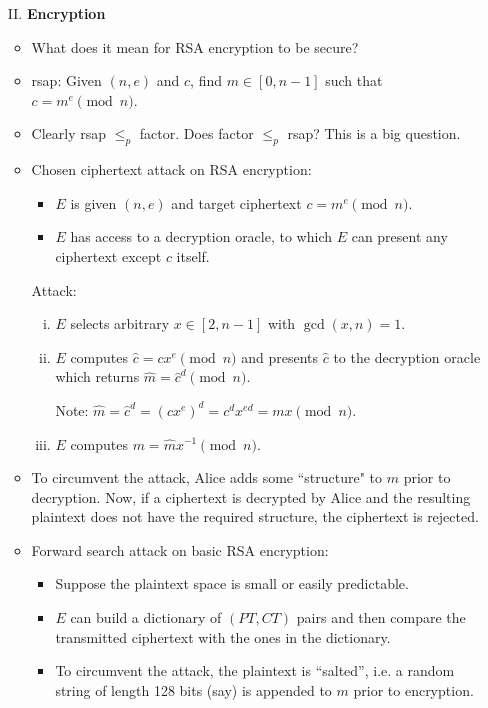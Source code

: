 \documentclass[a4paper,12pt]{article}
\begin{document}
\begin{enumerate}
\item[II.]
{\bf Encryption}
\begin{itemize}
\renewcommand{\labelitemii}{$\circ$}
\item
What does it mean for RSA encryption to be secure?
\item
{\sc rsap:} Given $(n,e)$ and $c$, find $m\in [0,n-1]$ such that $c=m^e\pmod n$.
\item
Clearly {\sc rsap} $\le_p$ {\sc factor}.  Does {\sc factor} $\le_p$ {\sc rsap}?
This is a big question.
\item
Chosen ciphertext attack on RSA encryption:
\begin{itemize}

\item
$E$ is given $(n,e)$ and target ciphertext $c=m^e \pmod n$.
\item
$E$ has access to a decryption oracle, to which $E$ can present any ciphertext except $c$ itself.
\end{itemize}
{\bf} Attack:
\begin{enumerate}[(i)]
\item
$E$ selects arbitrary $x\in [2,n-1]$ with $\gcd(x,n)=1$.
\item
$E$ computes $\hat c = cx^e \pmod n$ and presents $\hat c$ to the decryption oracle which returns $\hat m = \hat c^d \pmod n$.

Note: $\hat m = \hat c^d = (cx^e)^d = c^dx^{ed} = mx \pmod n$.
\item
$E$ computes $m=\hat m x^{-1} \pmod n$.
\end{enumerate}
\item
To circumvent the attack, Alice adds some ``structure" to $m$ prior to decryption.  Now, if a ciphertext is decrypted by Alice and the resulting plaintext does not have the required structure, the ciphertext is rejected.
\item
Forward search attack on basic RSA encryption:
\begin{itemize}
\item
Suppose the plaintext space is small or easily predictable.
\item
$E$ can build a dictionary of $(PT,CT)$ pairs and then compare the transmitted ciphertext with the ones in the dictionary.
\item
To circumvent the attack, the plaintext is ``salted'', i.e. a random string of length 128 bits (say) is appended to $m$ prior to encryption.
\end{itemize}
\end{itemize}

\end{enumerate}
\end{document}
